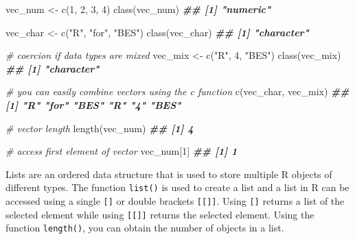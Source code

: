 \documentclass[
]{book}
\newenvironment{Shaded}{\begin{snugshade}}{\end{snugshade}}
\newcommand{\CommentTok}[1]{\textcolor[rgb]{0.56,0.35,0.01}{\textit{#1}}}
\newcommand{\DecValTok}[1]{\textcolor[rgb]{0.00,0.00,0.81}{#1}}
\newcommand{\DocumentationTok}[1]{\textcolor[rgb]{0.56,0.35,0.01}{\textbf{\textit{#1}}}}
\newcommand{\FunctionTok}[1]{\textcolor[rgb]{0.00,0.00,0.00}{#1}}
\newcommand{\NormalTok}[1]{#1}
\newcommand{\OtherTok}[1]{\textcolor[rgb]{0.56,0.35,0.01}{#1}}
\newcommand{\StringTok}[1]{\textcolor[rgb]{0.31,0.60,0.02}{#1}}
\begin{document}
\begin{Shaded}
\begin{Highlighting}[]
\NormalTok{vec\_num }\OtherTok{\textless{}{-}} \FunctionTok{c}\NormalTok{(}\DecValTok{1}\NormalTok{, }\DecValTok{2}\NormalTok{, }\DecValTok{3}\NormalTok{, }\DecValTok{4}\NormalTok{)}
\FunctionTok{class}\NormalTok{(vec\_num)}
\DocumentationTok{\#\# [1] "numeric"}

\NormalTok{vec\_char }\OtherTok{\textless{}{-}} \FunctionTok{c}\NormalTok{(}\StringTok{"R"}\NormalTok{, }\StringTok{"for"}\NormalTok{, }\StringTok{"BES"}\NormalTok{)}
\FunctionTok{class}\NormalTok{(vec\_char)}
\DocumentationTok{\#\# [1] "character"}

\CommentTok{\# coercion if data types are mixed}
\NormalTok{vec\_mix }\OtherTok{\textless{}{-}} \FunctionTok{c}\NormalTok{(}\StringTok{"R"}\NormalTok{, }\DecValTok{4}\NormalTok{, }\StringTok{"BES"}\NormalTok{)}
\FunctionTok{class}\NormalTok{(vec\_mix)}
\DocumentationTok{\#\# [1] "character"}

\CommentTok{\# you can easily combine vectors using the c function}
\FunctionTok{c}\NormalTok{(vec\_char, vec\_mix)}
\DocumentationTok{\#\# [1] "R"   "for" "BES" "R"   "4"   "BES"}

\CommentTok{\# vector length}
\FunctionTok{length}\NormalTok{(vec\_num)}
\DocumentationTok{\#\# [1] 4}

\CommentTok{\# access first element of vector}
\NormalTok{vec\_num[}\DecValTok{1}\NormalTok{]}
\DocumentationTok{\#\# [1] 1}
\end{Highlighting}
\end{Shaded}

Lists are an ordered data structure that is used to store multiple R objects of different types. The function \texttt{list()} is used to create a list and a list in R can be accessed using a single \texttt{{[}{]}} or double brackets \texttt{{[}{[}{]}{]}}. Using \texttt{{[}{]}} returns a list of the selected element while using \texttt{{[}{[}{]}{]}} returns the selected element. Using the function \texttt{length()}, you can obtain the number of objects in a list.
\end{document}
